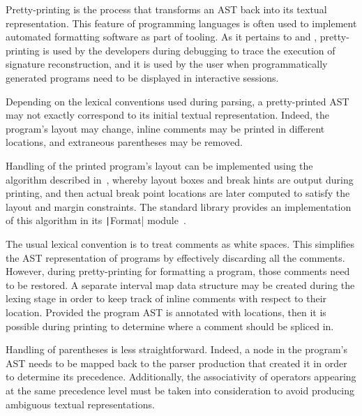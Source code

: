 
Pretty-printing is the process that transforms an \ac{AST} back into its textual representation.
This feature of programming languages is often used to implement automated formatting software as part of tooling.
As it pertains to \Beluga and \Harpoon, pretty-printing is used by the developers during debugging to trace the execution of signature reconstruction, and it is used by the user when programmatically generated programs need to be displayed in interactive sessions.


Depending on the lexical conventions used during parsing, a pretty-printed \ac{AST} may not exactly correspond to its initial textual representation.
Indeed, the program's layout may change, inline comments may be printed in different locations, and extraneous parentheses may be removed.

Handling of the printed program's layout can be implemented using the algorithm described in~\cite{oppen1980prettyprinting}, whereby layout boxes and break hints are output during printing, and then actual break point locations are later computed to satisfy the layout and margin constraints.
The \OCaml standard library provides an implementation of this algorithm in its \texttt|Format| module~\cite{leroy2022ocaml}.

The usual lexical convention is to treat comments as white spaces.
This simplifies the \ac{AST} representation of programs by effectively discarding all the comments.
However, during pretty-printing for formatting a program, those comments need to be restored.
A separate interval map data structure may be created during the lexing stage in order to keep track of inline comments with respect to their location.
Provided the program \ac{AST} is annotated with locations, then it is possible during printing to determine where a comment should be spliced in.

Handling of parentheses is less straightforward.
Indeed, a node in the program's \ac{AST} needs to be mapped back to the parser production that created it in order to determine its precedence.
Additionally, the associativity of operators appearing at the same precedence level must be taken into consideration to avoid producing ambiguous textual representations.


